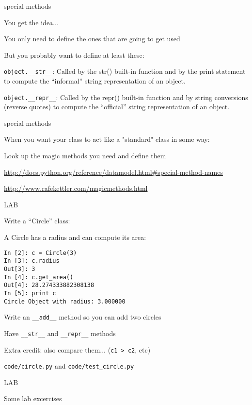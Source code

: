 \documentclass{beamer}
\begin{document}
\begin{frame}[fragile]{special methods}

{\Large You get the idea...}

\vfill
{\Large You only need to define the ones that are going to get used}

\vfill
{\Large But you probably want to define at least these:}

\vfill
\verb|object.__str__|: Called by the str() built-in function and by the print statement to compute the “informal” string representation of an object.

\vfill
\verb|object.__repr__|: Called by the repr() built-in function and by string conversions (reverse quotes) to compute the “official” string representation of an object.

\end{frame} 

\begin{frame}[fragile]{special methods}

\vfill
{\Large When you want your class to act like a "standard" class in some way:}

\vfill
{\Large Look up the magic methods you need and define them}

\vfill
\url{http://docs.python.org/reference/datamodel.html#special-method-names}

\vfill
\url{http://www.rafekettler.com/magicmethods.html}
\end{frame} 

\begin{frame}[fragile]{LAB}

{\Large Write a ``Circle'' class:}


\vfill
{\large A Circle has a radius and can compute its area:}
\begin{verbatim}
In [2]: c = Circle(3)
In [3]: c.radius
Out[3]: 3
In [4]: c.get_area()
Out[4]: 28.274333882308138
In [5]: print c
Circle Object with radius: 3.000000
\end{verbatim}
{\large Write an \verb|__add__| method so you can add two circles }

\vfill
{\large Have \verb|__str__| and \verb|__repr__| methods }

\vfill
{\large Extra credit: also compare them... (\verb|c1 > c2|, etc)}

\vfill
{\large \verb|code/circle.py| and \verb|code/test_circle.py|}
\end{frame}


\begin{frame}{LAB}

\vfill
{\large Some lab excercises}
\vfill

\end{frame}
\end{document}
